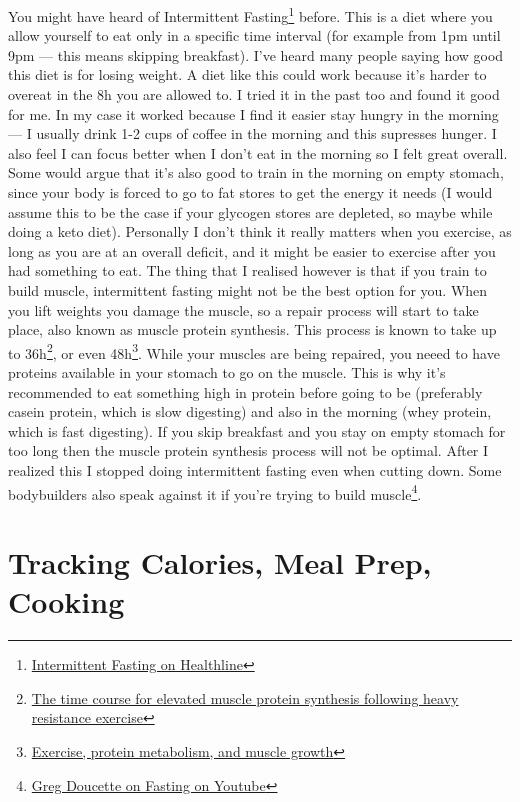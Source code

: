 \documentclass[openany, 12pt]{book}
\begin{document}
        You might have heard of Intermittent Fasting\footnote{\href{https://www.healthline.com/nutrition/intermittent-fasting-guide}{Intermittent Fasting on Healthline}}
        before. This is a diet where you allow yourself to eat only in a specific time interval (for example from 1pm until 9pm --- this means skipping breakfast).
        I've heard many people saying how good this diet is for losing weight. A diet like this could work because it's harder to overeat in the 8h you are allowed to.
        I tried it in the past too and found it good for me. In my case it worked because I find it easier stay hungry in the morning --- I usually drink 1-2 cups of coffee
        in the morning and this supresses hunger. I also feel I can focus better when I don't eat in the morning so I felt great overall. Some would argue that it's also good
        to train in the morning on empty stomach, since your body is forced to go to fat stores to get the energy it needs (I would assume this to be the case if your glycogen
        stores are depleted, so maybe while doing a keto diet). Personally I don't think it really matters when you exercise, as long as you are at an overall deficit, and it
        might be easier to exercise after you had something to eat. The thing that I realised however is that if you train to build muscle, intermittent fasting might
        not be the best option for you. When you lift weights you damage the muscle, so a repair process will start to take place, also known as muscle protein synthesis.
        This process is known to take up to 36h\footnote{\href{https://pubmed.ncbi.nlm.nih.gov/8563679/}{The time course for elevated muscle protein synthesis following heavy resistance exercise}},
        or even 48h\footnote{\href{https://pubmed.ncbi.nlm.nih.gov/11255140/}{Exercise, protein metabolism, and muscle growth}}. While your muscles are being repaired, you
        neeed to have proteins available in your stomach to go on the muscle. This is why it's recommended to eat something high in protein before going to be (preferably casein
        protein, which is slow digesting) and also in the morning (whey protein, which is fast digesting). If you skip breakfast and you stay on empty stomach for too long
        then the muscle protein synthesis process will not be optimal. After I realized this I stopped doing intermittent fasting even when cutting down. Some bodybuilders
        also speak against it if you're trying to build muscle\footnote{\href{https://www.youtube.com/watch?v=cMZ8Ijq-6Do}{Greg Doucette on Fasting on Youtube}}.

        \section{Tracking Calories, Meal Prep, Cooking}

        
		
\end{document}
